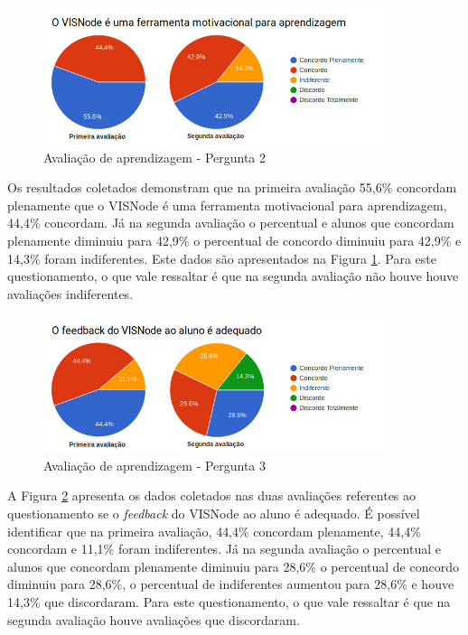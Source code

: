 \documentclass[
	12pt,				%
	oneside,			%
	a4paper,			%
	english,			%
	french,				%
	spanish,			%
	brazil,				%
	]{abntex2}
\begin{document}
\begin{figure}[H]
\centering
\caption{Avaliação de aprendizagem - Pergunta 2}\label{fig:avaliacaoAprendizagem2}
\includegraphics[width=0.9\textwidth]{imagens/avaliacoes/aprendizagem_2.jpg}
\sourceAuthor
\end{figure}

Os resultados coletados demonstram que na primeira avaliação 55,6\% concordam plenamente que o VISNode é uma ferramenta motivacional para aprendizagem, 44,4\% concordam. Já na segunda avaliação o percentual e alunos que concordam plenamente diminuiu para 42,9\% o percentual de concordo diminuiu para 42,9\% e 14,3\% foram indiferentes. Este dados são apresentados na Figura \ref{fig:avaliacaoAprendizagem2}. Para este questionamento, o que vale ressaltar é que na segunda avaliação não houve houve avaliações indiferentes.

\begin{figure}[H]
\centering
\caption{Avaliação de aprendizagem - Pergunta 3}\label{fig:avaliacaoAprendizagem3}
\includegraphics[width=0.9\textwidth]{imagens/avaliacoes/aprendizagem_3.jpg}
\sourceAuthor
\end{figure}

A Figura \ref{fig:avaliacaoAprendizagem3} apresenta os dados coletados nas duas avaliações referentes ao questionamento se o \textit{feedback} do VISNode ao aluno é adequado. É possível identificar que na primeira avaliação, 44,4\%  concordam plenamente, 44,4\% concordam e 11,1\% foram indiferentes. Já na segunda avaliação o percentual e alunos que concordam plenamente diminuiu para 28,6\% o percentual de concordo diminuiu para 28,6\%, o percentual de indiferentes aumentou para 28,6\% e houve 14,3\% que discordaram. Para este questionamento, o que vale ressaltar é que na segunda avaliação houve avaliações que discordaram.
\end{document}
